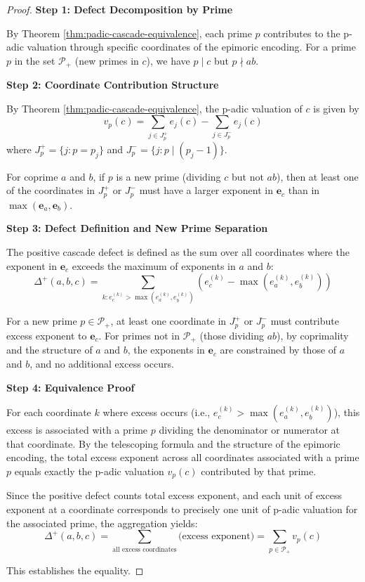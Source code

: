 \begin{proof}

\noindent \textbf{Step 1: Defect Decomposition by Prime}

By Theorem \ref{thm:padic-cascade-equivalence}, each prime $p$ contributes to the p-adic valuation through specific coordinates of the epimoric encoding. For a prime $p$ in the set $\mathcal{P}_+$ (new primes in $c$), we have $p \mid c$ but $p \nmid ab$.

\noindent \textbf{Step 2: Coordinate Contribution Structure}

By Theorem \ref{thm:padic-cascade-equivalence}, the p-adic valuation of $c$ is given by
\begin{equation}
v_p(c) = \sum_{j \in J_p^+} e_j(c) - \sum_{j \in J_p^-} e_j(c)
\end{equation}
where $J_p^+ = \{j : p = p_j\}$ and $J_p^- = \{j : p \mid (p_j - 1)\}$.

For coprime $a$ and $b$, if $p$ is a new prime (dividing $c$ but not $ab$), then at least one of the coordinates in $J_p^+$ or $J_p^-$ must have a larger exponent in $\mathbf{e}_c$ than in $\max(\mathbf{e}_a, \mathbf{e}_b)$.

\noindent \textbf{Step 3: Defect Definition and New Prime Separation}

The positive cascade defect is defined as the sum over all coordinates where the exponent in $\mathbf{e}_c$ exceeds the maximum of exponents in $a$ and $b$:
\begin{equation}
\Delta^+(a,b,c) = \sum_{k: e_c^{(k)} > \max(e_a^{(k)}, e_b^{(k)})} (e_c^{(k)} - \max(e_a^{(k)}, e_b^{(k)}))
\end{equation}

For a new prime $p \in \mathcal{P}_+$, at least one coordinate in $J_p^+$ or $J_p^-$ must contribute excess exponent to $\mathbf{e}_c$. For primes not in $\mathcal{P}_+$ (those dividing $ab$), by coprimality and the structure of $a$ and $b$, the exponents in $\mathbf{e}_c$ are constrained by those of $a$ and $b$, and no additional excess occurs.

\noindent \textbf{Step 4: Equivalence Proof}

For each coordinate $k$ where excess occurs (i.e., $e_c^{(k)} > \max(e_a^{(k)}, e_b^{(k)})$), this excess is associated with a prime $p$ dividing the denominator or numerator at that coordinate. By the telescoping formula and the structure of the epimoric encoding, the total excess exponent across all coordinates associated with a prime $p$ equals exactly the p-adic valuation $v_p(c)$ contributed by that prime.

Since the positive defect counts total excess exponent, and each unit of excess exponent at a coordinate corresponds to precisely one unit of p-adic valuation for the associated prime, the aggregation yields:
\begin{equation}
\Delta^+(a,b,c) = \sum_{\text{all excess coordinates}} \text{(excess exponent)} = \sum_{p \in \mathcal{P}_+} v_p(c)
\end{equation}

This establishes the equality.

\end{proof}

